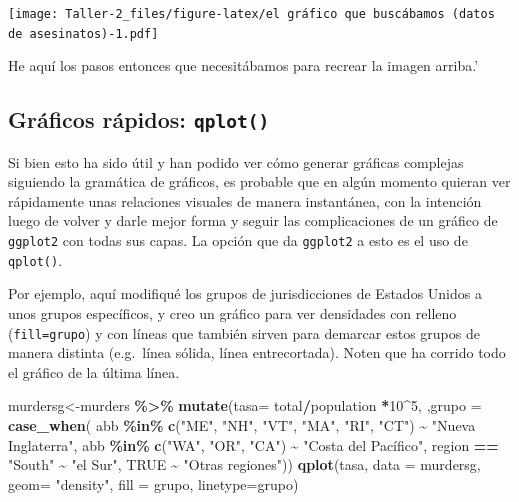 \documentclass[
]{article}
\newenvironment{Shaded}{\begin{snugshade}}{\end{snugshade}}
\newcommand{\AttributeTok}[1]{\textcolor[rgb]{0.13,0.29,0.53}{#1}}
\newcommand{\ConstantTok}[1]{\textcolor[rgb]{0.56,0.35,0.01}{#1}}
\newcommand{\DecValTok}[1]{\textcolor[rgb]{0.00,0.00,0.81}{#1}}
\newcommand{\FunctionTok}[1]{\textcolor[rgb]{0.13,0.29,0.53}{\textbf{#1}}}
\newcommand{\NormalTok}[1]{#1}
\newcommand{\OtherTok}[1]{\textcolor[rgb]{0.56,0.35,0.01}{#1}}
\newcommand{\SpecialCharTok}[1]{\textcolor[rgb]{0.81,0.36,0.00}{\textbf{#1}}}
\newcommand{\StringTok}[1]{\textcolor[rgb]{0.31,0.60,0.02}{#1}}
\begin{document}
\texttt{[image: Taller-2\_files/figure-latex/el gráfico que buscábamos (datos de asesinatos)-1.pdf]}

He aquí los pasos entonces que necesitábamos para recrear la imagen
arriba.'

\subsection{\texorpdfstring{Gráficos rápidos:
\texttt{qplot()}}{Gráficos rápidos: qplot()}}\label{gruxe1ficos-ruxe1pidos-qplot}

Si bien esto ha sido útil y han podido ver cómo generar gráficas
complejas siguiendo la gramática de gráficos, es probable que en algún
momento quieran ver rápidamente unas relaciones visuales de manera
instantánea, con la intención luego de volver y darle mejor forma y
seguir las complicaciones de un gráfico de \texttt{ggplot2} con todas
sus capas. La opción que da \texttt{ggplot2} a esto es el uso de
\texttt{qplot()}.

Por ejemplo, aquí modifiqué los grupos de jurisdicciones de Estados
Unidos a unos grupos específicos, y creo un gráfico para ver densidades
con relleno (\texttt{fill=grupo}) y con líneas que también sirven para
demarcar estos grupos de manera distinta (e.g.~línea sólida, línea
entrecortada). Noten que ha corrido todo el gráfico de la última línea.

\begin{Shaded}
\begin{Highlighting}[]
\NormalTok{murdersg}\OtherTok{\textless{}{-}}\NormalTok{murders }\SpecialCharTok{\%\textgreater{}\%}
  \FunctionTok{mutate}\NormalTok{(}\AttributeTok{tasa=}\NormalTok{ total}\SpecialCharTok{/}\NormalTok{population }\SpecialCharTok{*}\DecValTok{10}\SpecialCharTok{\^{}}\DecValTok{5}\NormalTok{,}
\NormalTok{    ,}\AttributeTok{grupo =} \FunctionTok{case\_when}\NormalTok{(}
\NormalTok{    abb }\SpecialCharTok{\%in\%} \FunctionTok{c}\NormalTok{(}\StringTok{"ME"}\NormalTok{, }\StringTok{"NH"}\NormalTok{, }\StringTok{"VT"}\NormalTok{, }\StringTok{"MA"}\NormalTok{, }\StringTok{"RI"}\NormalTok{, }\StringTok{"CT"}\NormalTok{) }\SpecialCharTok{\textasciitilde{}} \StringTok{"Nueva Inglaterra"}\NormalTok{,}
\NormalTok{    abb }\SpecialCharTok{\%in\%} \FunctionTok{c}\NormalTok{(}\StringTok{"WA"}\NormalTok{, }\StringTok{"OR"}\NormalTok{, }\StringTok{"CA"}\NormalTok{) }\SpecialCharTok{\textasciitilde{}} \StringTok{"Costa del Pacífico"}\NormalTok{,}
\NormalTok{    region }\SpecialCharTok{==} \StringTok{"South"} \SpecialCharTok{\textasciitilde{}} \StringTok{"el Sur"}\NormalTok{,}
    \ConstantTok{TRUE} \SpecialCharTok{\textasciitilde{}} \StringTok{"Otras regiones"}\NormalTok{))}
\FunctionTok{qplot}\NormalTok{(tasa, }\AttributeTok{data =}\NormalTok{ murdersg, }\AttributeTok{geom=} \StringTok{"density"}\NormalTok{, }\AttributeTok{fill =}\NormalTok{ grupo, }\AttributeTok{linetype=}\NormalTok{grupo)}
\end{Highlighting}
\end{Shaded}
\end{document}
